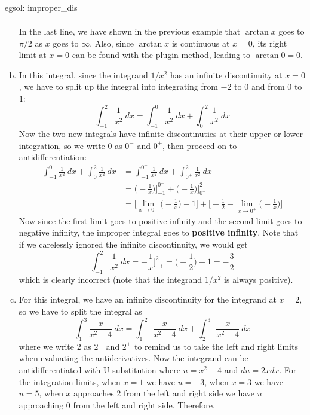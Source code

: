 \begin{egsol}[]{egsol: improper_dis}
\begin{enumerate}[a)]
\begin{align*}
        \end{align*}
        In the last line, we have shown in the previous example that $\arctan x$ goes to $\pi/2$ as $x$ goes to $\infty$.  Also, since $\arctan x$ is continuous at $x = 0$, its right limit at $x = 0$ can be found with the plugin method, leading to $\arctan 0 = 0$. 
        \item In this integral, since the integrand $1/x^2$ has an infinite discontinuity at $x = 0$, we have to split up the integral into integrating from $-2$ to $0$ and from $0$ to $1$:
        \[\int_{-1}^2 \frac{1}{x^2}~dx = \int_{-1}^{0} \frac{1}{x^2}~dx + \int_{0}^2 \frac{1}{x^2}~dx\]
        Now the two new integrals have infinite discontinuties at their upper or lower integration, so we write $0$ as $0^-$ and $0^+$, then proceed on to antidifferentiation:
        \begin{align*}
            \int_{-1}^{0} \frac{1}{x^2}~dx + \int_{0}^2 \frac{1}{x^2}~dx &= \int_{-1}^{0^-} \frac{1}{x^2}~dx + \int_{0^+}^2 \frac{1}{x^2}~dx\\
            &= \big(-\frac{1}{x}\big)\Big]_{-1}^{0^-} + \big(-\frac{1}{x}\big)\Big]_{0^+}^{2}\\
            &= \Big[\lim_{x \rightarrow 0^-} \big(-\frac{1}{x}\big) - 1\Big] + \Big[-\frac{1}{2}-\lim_{x \rightarrow 0^+} \big(-\frac{1}{x}\big)\Big]
        \end{align*}
        Now since the first limit goes to positive infinity and the second limit goes to negative infinity, the improper integral goes to \textbf{positive infinity}.  Note that if we carelessly ignored the infinite discontinuity, we would get 
        \[\int_{-1}^2 \frac{1}{x^2}~dx = -\frac{1}{x}\Big]_{-1}^2 = \big(-\frac{1}{2}\big)-1 = -\frac{3}{2}\]
        which is clearly incorrect (note that the integrand $1/x^2$ is always positive).
        \item For this integral, we have an infinite discontinuity for the integrand at $x = 2$, so we have to split the integral as
        \[\int_1^3 \frac{x}{x^2-4}~dx = \int_1^{2^-} \frac{x}{x^2-4}~dx + \int_{2^+}^3 \frac{x}{x^2-4}~dx\]
        where we write $2$ as $2^-$ and $2^+$ to remind us to take the left and right limits when evaluating the antiderivatives.  Now the integrand can be antidifferentiated with U-substitution where $u = x^2-4$ and $du = 2xdx$.  For the integration limits, when $x = 1$ we have $u = -3$, when $x = 3$ we have $u = 5$, when $x$ approaches $2$ from the left and right side we have $u$ approaching $0$ from the left and right side.  Therefore,
        \begin{align*}

\end{align*}
\end{enumerate}
\end{egsol}

